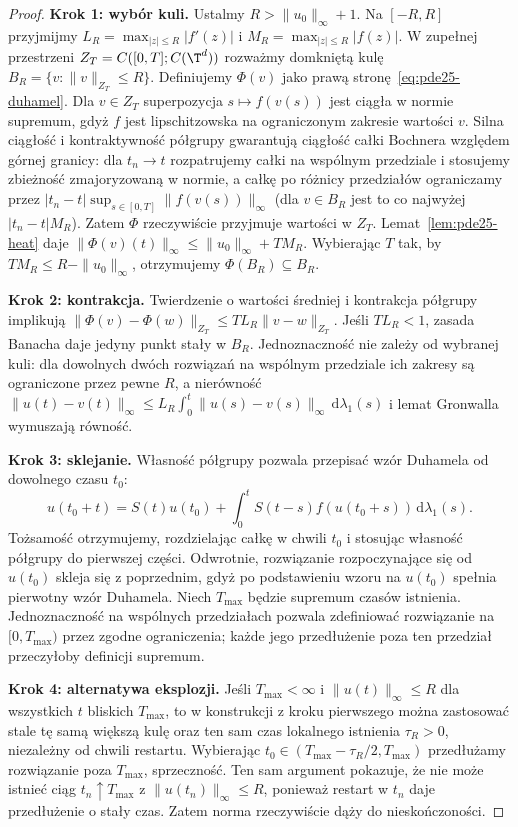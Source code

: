 \begin{proof}
\textbf{Krok 1: wybór kuli.} Ustalmy $R>\|u_0\|_\infty+1$.
Na $[-R,R]$ przyjmijmy
$L_R=\max_{|z|\le R}|f'(z)|$ i
$M_R=\max_{|z|\le R}|f(z)|$.
W zupełnej przestrzeni $Z_T=C([0,T];C(\T^d))$
rozważmy domkniętą kulę
$B_R=\{v:\|v\|_{Z_T}\le R\}$.
Definiujemy $\Phi(v)$ jako prawą stronę~\eqref{eq:pde25-duhamel}.
Dla $v\in Z_T$ superpozycja $s\mapsto f(v(s))$ jest
ciągła w normie supremum, gdyż $f$ jest lipschitzowska
na ograniczonym zakresie wartości $v$.
Silna ciągłość i kontraktywność półgrupy gwarantują
ciągłość całki Bochnera względem górnej granicy:
dla $t_n\to t$ rozpatrujemy całki na wspólnym
przedziale i stosujemy zbieżność zmajoryzowaną w normie,
a całkę po różnicy przedziałów ograniczamy przez
$|t_n-t|\sup_{s\in[0,T]}\|f(v(s))\|_\infty$
(dla $v\in B_R$ jest to co najwyżej $|t_n-t|M_R$). Zatem $\Phi$ rzeczywiście przyjmuje
wartości w $Z_T$.
Lemat~\ref{lem:pde25-heat} daje
$\|\Phi(v)(t)\|_\infty\le\|u_0\|_\infty+TM_R$.
Wybierając $T$ tak, by $TM_R\le R-\|u_0\|_\infty$,
otrzymujemy $\Phi(B_R)\subseteq B_R$.

\textbf{Krok 2: kontrakcja.} Twierdzenie o wartości średniej
i kontrakcja półgrupy implikują
$\|\Phi(v)-\Phi(w)\|_{Z_T}\le TL_R\|v-w\|_{Z_T}$.
Jeśli $TL_R<1$, zasada Banacha daje jedyny punkt stały
w $B_R$. Jednoznaczność nie zależy od wybranej kuli:
dla dowolnych dwóch rozwiązań na wspólnym przedziale
ich zakresy są ograniczone przez pewne $R$, a nierówność
$\|u(t)-v(t)\|_\infty\le
L_R\int_0^t\|u(s)-v(s)\|_\infty\,\mathrm d\lambda_1(s)$
i lemat Gronwalla wymuszają równość.

\textbf{Krok 3: sklejanie.} Własność półgrupy pozwala przepisać
wzór Duhamela od dowolnego czasu $t_0$:
\[
 u(t_0+t)=S(t)u(t_0)+
 \int_0^tS(t-s)f(u(t_0+s))\,\mathrm d\lambda_1(s).
\]
Tożsamość otrzymujemy, rozdzielając całkę w chwili
$t_0$ i stosując własność półgrupy do pierwszej części.
Odwrotnie, rozwiązanie rozpoczynające się od $u(t_0)$
skleja się z poprzednim, gdyż po podstawieniu wzoru
na $u(t_0)$ spełnia pierwotny wzór Duhamela.
Niech $T_{\max}$ będzie supremum czasów istnienia.
Jednoznaczność na wspólnych przedziałach pozwala
zdefiniować rozwiązanie na $[0,T_{\max})$ przez
zgodne ograniczenia; każde jego przedłużenie poza
ten przedział przeczyłoby definicji supremum.

\textbf{Krok 4: alternatywa eksplozji.} Jeśli $T_{\max}<\infty$
i $\|u(t)\|_\infty\le R$ dla wszystkich $t$ bliskich
$T_{\max}$, to w konstrukcji z kroku pierwszego można
zastosować stale tę samą większą kulę oraz ten sam czas
lokalnego istnienia $\tau_R>0$, niezależny od chwili restartu.
Wybierając $t_0\in(T_{\max}-\tau_R/2,T_{\max})$
przedłużamy rozwiązanie poza $T_{\max}$, sprzeczność.
Ten sam argument pokazuje, że nie może istnieć ciąg
$t_n\uparrow T_{\max}$ z $\|u(t_n)\|_\infty\le R$,
ponieważ restart w $t_n$ daje przedłużenie o stały czas.
Zatem norma rzeczywiście dąży do nieskończoności.
\end{proof}

